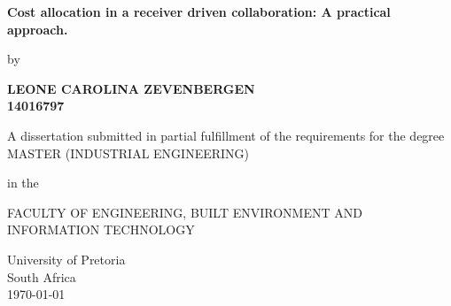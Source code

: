 \begin{titlepage}
    \begin{center}
        
        
        
        \LARGE
        \vspace{3.0 cm}
        \textbf{Cost allocation in a receiver driven collaboration: A practical approach.}
        
        \vspace{1.5cm}
        \large
        by
        
        \Large
        \vspace{1.5cm}
        \textbf{{LEONE CAROLINA ZEVENBERGEN}\\
                {14016797}}
        
        \vfill
        \small
        A dissertation submitted in partial fulfillment of the requirements for the degree\\
        \large
        MASTER (INDUSTRIAL ENGINEERING)
        
        \vspace{1.5cm}
        
        \large
        in the\\
        \vspace{1.5cm}
        
        FACULTY OF ENGINEERING, BUILT ENVIRONMENT AND INFORMATION TECHNOLOGY\\
        
        \vspace{1.5cm}
         
        \large
      
        University of Pretoria\\
        South Africa \\
        
        \vspace{1.5 cm}
        \today
        \vspace{3.0 cm}


    \end{center}
\end{titlepage}